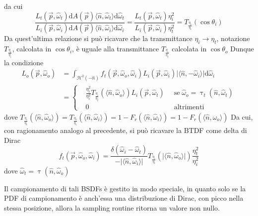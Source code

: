 da cui
\begin{equation}
	\frac{L_t(\vec{p},\hat{\omega}_t)\mathrm{d}A(\vec{p})\langle\hat{n},\hat{\omega}_t\rangle\mathrm{d}\hat{\omega}_t}%
	{L_i(\vec{p},\hat{\omega}_i)\mathrm{d}A(\vec{p})\langle\hat{n},\hat{\omega}_i\rangle\mathrm{d}\hat{\omega}_i} = %
	\frac{L_t(\vec{p},\hat{\omega}_t)\eta^2_i}{L_i(\vec{p},\hat{\omega}_i)\eta^2_t} = T_{\frac{\eta_t}{\eta_i}}(\cos\theta_i)
\end{equation}
Da quest'ultima relazione si pu\`o ricavare che la transmittance $\eta_i\rightarrow\eta_t$, notazione $T_{\frac{\eta_t}{\eta_i}}$, calcolata in 
$\cos\theta_i$\footnotemark{}, \`e uguale alla transmittance $T_{\frac{\eta_i}{\eta_t}}$ calcolata in $\cos\theta_o$
Dunque la condizione
\begin{align}
	L_o(\vec{p},\hat{\omega}_o)&=\int_{\mathcal{H}^2(-\hat{n})}f_t(\vec{p},\hat{\omega}_o,\hat{\omega}_i)%
		L_i(\vec{p},\hat{\omega}_i)\vert\langle\hat{n},-\hat{\omega}_i\rangle\vert\mathrm{d}\hat{\omega}_i%
		\\&=\left\{\begin{aligned}
			&\frac{\eta^2_t}{\eta_i^2}T_{\frac{\eta_i}{\eta_t}}(\langle\hat{n},\hat{\omega}_o\rangle)L_i(\vec{p},\hat{\omega}_t)%
				\;\;&\mathrm{se}\;\hat{\omega}_o=\uptau_t(\hat{n},\hat{\omega}_t)\\
			&0 &\mathrm{altrimenti}
		\end{aligned}\right.
\end{align}
dove $T_{\frac{\eta_i}{\eta_t}}(\langle\hat{n},\hat{\omega}_o\rangle)=T_{\frac{\eta_t}{\eta_i}}(\langle\hat{n},\hat{\omega}_i\rangle)%
	= 1 - F_r(\langle\hat{n},\hat{\omega}_i\rangle) = 1 - F_r(\langle\hat{n},\hat{\omega}_o\rangle)$
Da cui, con ragionamento analogo al precedente, si pu\`o ricavare la BTDF come delta di Dirac
\begin{equation}
	f_t(\vec{p},\hat{\omega}_o,\hat{\omega}_i)=%
		\frac{\delta(\hat{\omega}_i-\hat{\omega}_t)}{-\vert\langle\hat{n},\hat{\omega}_i\rangle\vert}
		T_{\frac{\eta_i}{\eta_t}}(\vert\langle\hat{n},\hat{\omega}_o\rangle\vert)
		\frac{\eta_t^2}{\eta_i^2}
\end{equation}
dove $\hat{\omega}_t=\uptau(\hat{n},\hat{\omega}_o)$\par
Il campionamento di tali BSDFs \`e gestito in modo speciale, in quanto solo se la PDF di campionamento \`e anch'essa una distribuzione di Dirac, 
con picco nella stessa posizione, allora la sampling routine ritorna un valore non nullo.
